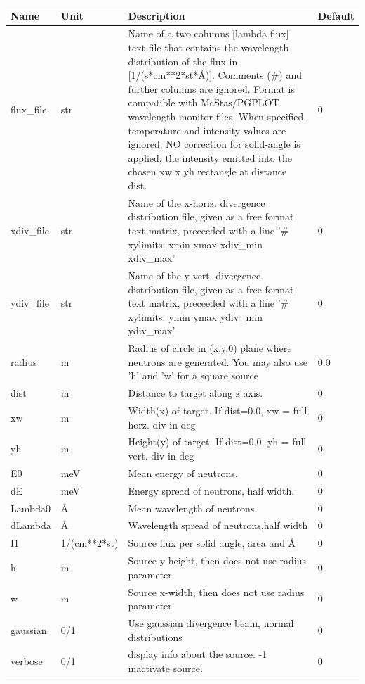 \begin{longtable}{p{}p{}p{}p{}}
\toprule
\textbf{Name} & \textbf{Unit} & \textbf{Description} & \textbf{Default} \\
\midrule
\endhead
flux\_file & str & Name of a two columns [lambda flux] text file that contains the wavelength distribution of the flux in [1/(s*cm**2*st*\AA{})]. Comments (\#) and further columns are ignored. Format is compatible with McStas/PGPLOT wavelength monitor files. When specified, temperature and intensity values are ignored. NO correction for solid-angle is applied, the intensity emitted into the chosen xw x yh rectangle at distance dist. & 0 \\
xdiv\_file & str & Name of the x-horiz. divergence distribution file, given as a free format text matrix, preceeded with a line '\# xylimits: xmin xmax xdiv\_min xdiv\_max' & 0 \\
ydiv\_file & str & Name of the y-vert. divergence distribution file, given as a free format text matrix, preceeded with a line '\# xylimits: ymin ymax ydiv\_min ydiv\_max' & 0 \\
radius & m & Radius of circle in (x,y,0) plane where neutrons are generated. You may also use 'h' and 'w' for a square source & 0.0 \\
dist & m & Distance to target along z axis. & 0 \\
xw & m & Width(x) of target. If dist=0.0, xw = full horz. div  in deg & 0 \\
yh & m & Height(y) of target. If dist=0.0, yh = full vert. div in deg & 0 \\
E0 & meV & Mean energy of neutrons. & 0 \\
dE & meV & Energy spread of neutrons, half width. & 0 \\
Lambda0 & \AA{} & Mean wavelength of neutrons. & 0 \\
dLambda & \AA{} & Wavelength spread of neutrons,half width & 0 \\
I1 & 1/(cm**2*st) & Source flux per solid angle, area and \AA{} & 0 \\
h & m & Source y-height, then does not use radius parameter & 0 \\
w & m & Source x-width, then does not use radius parameter & 0 \\
gaussian & 0/1 & Use gaussian divergence beam, normal distributions & 0 \\
verbose & 0/1 & display info about the source. -1 inactivate source. & 0 \\

\end{longtable}
